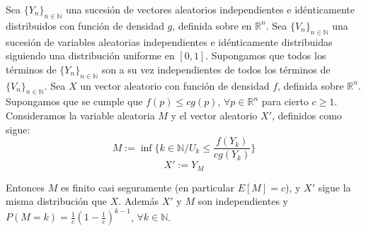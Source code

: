\begin{teorema}
Sea $\{Y_n\}_{n\in\mathds{N}}$ una sucesión de vectores aleatorios independientes e idénticamente distribuidos con función de densidad $g$, definida sobre en $\mathds{R}^n$. Sea $\{V_n\}_{n\in\mathds{N}}$ una sucesión de variables aleatorias independientes e idénticamente distribuidas siguiendo una distribución uniforme en $[0,1]$. Supongamos que todos los términos de $\{Y_n\}_{n\in\mathds{N}}$ son a su vez independientes de todos los términos de $\{V_n\}_{n\in\mathds{N}}$. Sea $X$ un vector aleatorio con función de densidad $f$, definida sobre $\mathds{R}^n$. Supongamos que se cumple que $f(p)\leq c g(p)$, $\forall p\in\mathds{R}^n$ para cierto $c\geq 1$. Consideramos la variable aleatoria $M$ y el vector aleatorio $X'$, definidos como sigue:
$$M:=\inf\{k\in \mathds{N} / U_k\leq \frac{f(Y_k)}{c g(Y_k)}\} $$
$$X':=Y_M$$

Entonces $M$ es finito casi seguramente (en particular $E[M]=c$), y $X'$ sigue la misma distribución que $X$. Además $X'$ y $M$ son independientes y $P(M=k) = \frac{1}{c}(1-\frac{1}{c})^{k-1}$, $\forall k\in \mathds{N}$.
\end{teorema}
